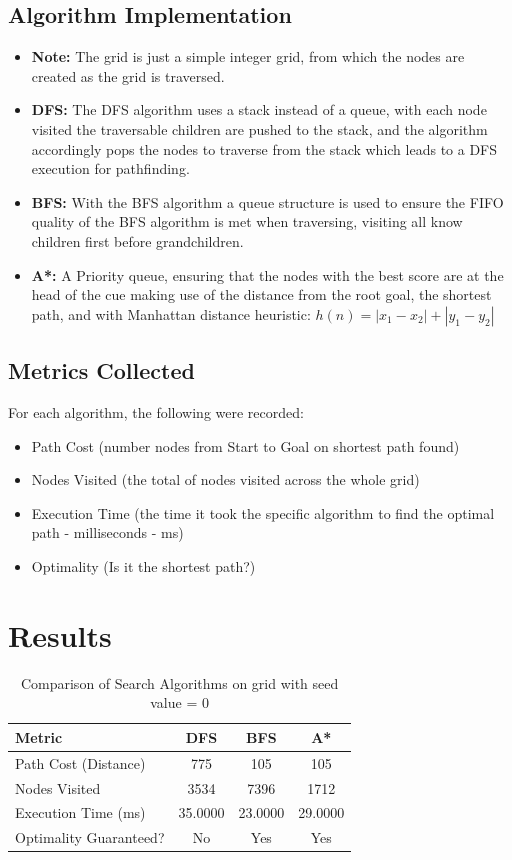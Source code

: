 \documentclass[12pt,a4paper]{article}
\begin{document}
\subsection{Algorithm Implementation}
\begin{itemize}
    \item \textbf{Note: } The grid is just a simple integer grid, from which the nodes
    are created as the grid is traversed.
    \item \textbf{DFS:} The DFS algorithm uses a stack instead of a queue, with each node visited the 
    traversable children are pushed to the stack, and the algorithm accordingly pops the nodes to traverse
    from the stack which leads to a DFS execution for pathfinding.
    \item \textbf{BFS:} With the BFS algorithm a queue structure is used to ensure the FIFO quality
    of the BFS algorithm is met when traversing, visiting all know children first before grandchildren.
    \item \textbf{A*:} A Priority queue, ensuring that the nodes with the best score are at the head
    of the cue making use of the distance from the root goal, the shortest path, and with Manhattan distance heuristic: 
    $h(n) = |x_1 - x_2| + |y_1 - y_2|$
\end{itemize}

\subsection{Metrics Collected}
For each algorithm, the following were recorded:
\begin{itemize}
    \item Path Cost (number nodes from Start to Goal on shortest path found)
    \item Nodes Visited (the total of nodes visited across the whole grid)
    \item Execution Time (the time it took the specific algorithm to find the optimal path - milliseconds - ms)
    \item Optimality (Is it the shortest path?)
\end{itemize}

\section{Results}

\begin{table}[H]
\centering
\caption{Comparison of Search Algorithms on grid with seed value = 0}
\begin{tabular}{@{}lccc@{}}
\toprule
\textbf{Metric} & \textbf{DFS} & \textbf{BFS} & \textbf{A*} \\
\midrule
Path Cost (Distance) & 775 & 105 & 105 \\
Nodes Visited & 3534 & 7396 & 1712 \\
Execution Time (ms) & 35.0000 & 23.0000 & 29.0000 \\
Optimality Guaranteed? & No & Yes & Yes \\
\bottomrule
\end{tabular}
\end{table}
\end{document}
